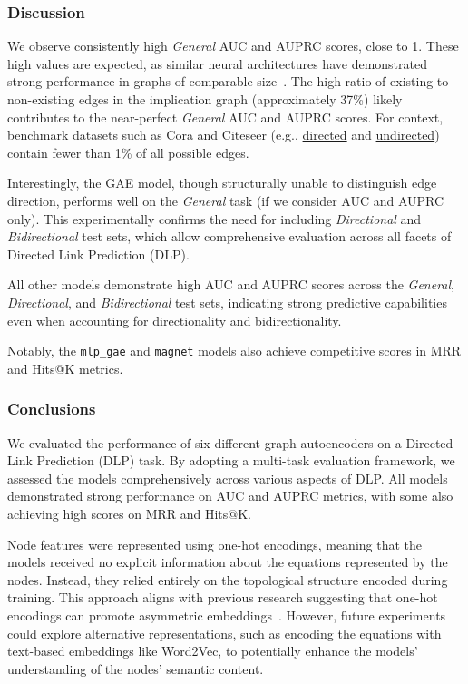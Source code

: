 \subsubsection{Discussion}

We observe consistently high \emph{General} AUC and AUPRC scores, close to 1.
These high values are expected, as similar neural architectures have demonstrated strong performance
in graphs of comparable size~\cite{Kipf2016}. The high ratio of existing to non-existing edges in the
implication graph (approximately 37\%) likely contributes to the near-perfect \emph{General} AUC and
AUPRC scores. For context, benchmark datasets such as Cora and Citeseer
(e.g., \href{https://github.com/deezer/gravity_graph_autoencoders/tree/master/data}{directed}
and \href{https://pytorch-geometric.readthedocs.io/en/latest/generated/torch_geometric.datasets.Planetoid.html}{undirected})
contain fewer than 1\% of all possible edges.

Interestingly, the GAE model, though structurally unable to distinguish edge direction, performs well
on the \emph{General} task (if we consider AUC and AUPRC only). This experimentally confirms the need
for including \emph{Directional} and \emph{Bidirectional} test sets, which allow comprehensive
evaluation across all facets of Directed Link Prediction (DLP).

All other models demonstrate high AUC and AUPRC scores across the \emph{General}, \emph{Directional},
and \emph{Bidirectional} test sets, indicating strong predictive capabilities even when accounting for
directionality and bidirectionality.

Notably, the \texttt{mlp\_gae} and \texttt{magnet} models also achieve competitive scores in MRR and
Hits@K metrics.

\subsubsection{Conclusions}

We evaluated the performance of six different graph autoencoders on a Directed Link Prediction (DLP) task.
By adopting a multi-task evaluation framework, we assessed the models comprehensively across various
aspects of DLP. All models demonstrated strong performance on AUC and AUPRC metrics, with some also
achieving high scores on MRR and Hits@K.

Node features were represented using one-hot encodings, meaning that the models received no explicit
information about the equations represented by the nodes. Instead, they relied entirely on the
topological structure encoded during training. This approach aligns with previous research suggesting
that one-hot encodings can promote asymmetric embeddings~\cite{Salha2019}. However, future experiments
could explore alternative representations, such as encoding the equations with text-based embeddings
like Word2Vec, to potentially enhance the models' understanding of the nodes' semantic content.

